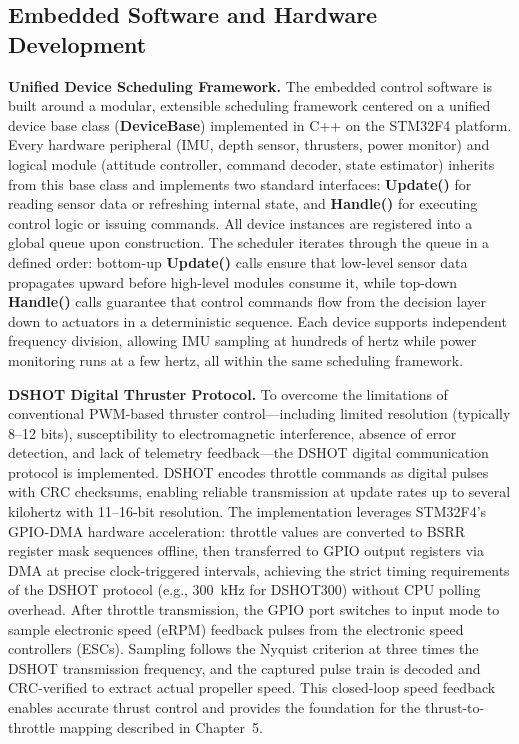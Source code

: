 \begin{digest}
\section{Embedded Software and Hardware Development}

\textbf{Unified Device Scheduling Framework.} The embedded control software is built around a modular, extensible scheduling framework centered on a unified device base class (\textbf{DeviceBase}) implemented in C++ on the STM32F4 platform. Every hardware peripheral (IMU, depth sensor, thrusters, power monitor) and logical module (attitude controller, command decoder, state estimator) inherits from this base class and implements two standard interfaces: \textbf{Update()} for reading sensor data or refreshing internal state, and \textbf{Handle()} for executing control logic or issuing commands. All device instances are registered into a global queue upon construction. The scheduler iterates through the queue in a defined order: bottom-up \textbf{Update()} calls ensure that low-level sensor data propagates upward before high-level modules consume it, while top-down \textbf{Handle()} calls guarantee that control commands flow from the decision layer down to actuators in a deterministic sequence. Each device supports independent frequency division, allowing IMU sampling at hundreds of hertz while power monitoring runs at a few hertz, all within the same scheduling framework.

\textbf{DSHOT Digital Thruster Protocol.} To overcome the limitations of conventional PWM-based thruster control---including limited resolution (typically 8--12 bits), susceptibility to electromagnetic interference, absence of error detection, and lack of telemetry feedback---the DSHOT digital communication protocol is implemented. DSHOT encodes throttle commands as digital pulses with CRC checksums, enabling reliable transmission at update rates up to several kilohertz with 11--16-bit resolution. The implementation leverages STM32F4's GPIO-DMA hardware acceleration: throttle values are converted to BSRR register mask sequences offline, then transferred to GPIO output registers via DMA at precise clock-triggered intervals, achieving the strict timing requirements of the DSHOT protocol (e.g., 300~kHz for DSHOT300) without CPU polling overhead. After throttle transmission, the GPIO port switches to input mode to sample electronic speed (eRPM) feedback pulses from the electronic speed controllers (ESCs). Sampling follows the Nyquist criterion at three times the DSHOT transmission frequency, and the captured pulse train is decoded and CRC-verified to extract actual propeller speed. This closed-loop speed feedback enables accurate thrust control and provides the foundation for the thrust-to-throttle mapping described in Chapter~5.


\end{digest}
